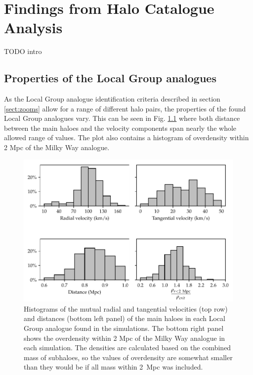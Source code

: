 \documentclass[english, oneside]{HYgradu}
\begin{document}
\chapter{Findings from Halo Catalogue Analysis} \label{chapt:results}
TODO intro %


\section{Properties of the Local Group analogues}
As the Local Group analogue identification criteria described in section \ref{sect:zooms} allow for a range of different halo pairs, the properties of the found Local Group analogues vary. This can be seen in Fig. \ref{fig:LGproperties} where both distance between the main haloes and the velocity components span nearly the whole allowed range of values. The plot also contains a histogram of overdensity within 2 Mpc of the Milky Way analogue.

\begin{figure}
    \centering
    \includegraphics{kuvat/LGproperties.pdf}
    \caption{Histograms of the mutual radial and tangential velocities (top row) and distances (bottom left panel) of the main haloes in each Local Group analogue found in the simulations. The bottom right panel shows the overdensity within 2 Mpc of the Milky Way analogue in each simulation. The densities are calculated based on the combined mass of subhaloes, so the values of overdensity are somewhat smaller than they would be if all mass within 2~Mpc was included.}\label{fig:LGproperties}
\end{figure}
\end{document}
